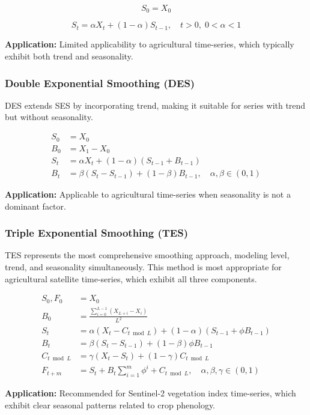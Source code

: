 \documentclass{article} %
\begin{document}
            \[
                S_0 = X_0
            \]

            \[
                S_t = \alpha X_t + (1 - \alpha) S_{t-1}, \quad t > 0, \; 0 < \alpha < 1
            \]

            \textbf{Application:} Limited applicability to agricultural time-series, which typically exhibit both trend and seasonality.

        \subsubsection{Double Exponential Smoothing (DES)}
            DES extends SES by incorporating trend, making it suitable for series with trend but without seasonality.

            \[
                \begin{aligned}
                S_0 &= X_0 \\
                B_0 &= X_1 - X_0 \\
                S_t &= \alpha X_t + (1 - \alpha)(S_{t-1} + B_{t-1}) \\
                B_t &= \beta (S_t - S_{t-1}) + (1 - \beta) B_{t-1}, \quad \alpha, \beta \in (0,1)
                \end{aligned}
            \]

            \textbf{Application:} Applicable to agricultural time-series when seasonality is not a dominant factor.

        \subsubsection{Triple Exponential Smoothing (TES)}
            TES represents the most comprehensive smoothing approach, modeling level, trend, and seasonality simultaneously. This method is most appropriate for agricultural satellite time-series, which exhibit all three components.

            \[
                \begin{aligned}
                S_0, F_0 &= X_0 \\
                B_0 &= \frac{\sum_{i=0}^{L-1} \left( X_{L+i} - X_i \right)}{L^2} \\
                S_t &= \alpha \left( X_t - C_{t \bmod L} \right) + (1 - \alpha)\left( S_{t-1} + \phi B_{t-1} \right) \\
                B_t &= \beta \left( S_t - S_{t-1} \right) + (1 - \beta)\phi B_{t-1} \\
                C_{t \bmod L} &= \gamma \left( X_t - S_t \right) + (1 - \gamma) C_{t \bmod L} \\
                F_{t+m} &= S_t + B_t \sum_{i=1}^{m} \phi^{i} + C_{t \bmod L}, \quad \alpha, \beta, \gamma \in (0,1)
                \end{aligned}
            \]

            \textbf{Application:} Recommended for Sentinel-2 vegetation index time-series, which exhibit clear seasonal patterns related to crop phenology.
\end{document}

